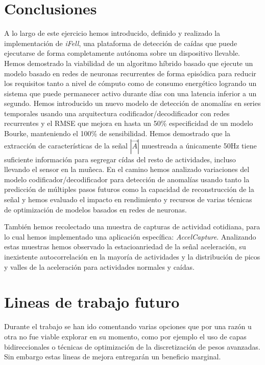 
\section{Conclusiones}

A lo largo de este ejercicio hemos introducido, definido y realizado la implementación de \textit{iFell}, una plataforma de detección de caídas que puede ejecutarse de forma completamente autónoma
sobre un dispositivo llevable. Hemos demostrado la viabilidad de un algoritmo híbrido basado que ejecute un modelo basado en redes de neuronas recurrentes de forma episódica para reducir los requisitos tanto a nivel de cómputo como de consumo energético logrando un sistema que puede permanecer activo durante días con una latencia inferior a un segundo. Hemos introducido un nuevo modelo de detección de anomalías en series temporales usando una arquitectura codificador/decodificador con redes recurrentes y el RMSE que mejora en hasta un 50\% especificidad de un modelo Bourke, manteniendo el 100\% de sensibilidad. Hemos demostrado que la extracción de características de la señal $|\vec{A}|$ muestreada a únicamente 50Hz tiene suficiente información para segregar cídas del resto de actividades, incluso llevando el sensor en la muñeca. En el camino hemos analizado variaciones del modelo codificador/decodificador para detección de anomalías usando tanto la predicción de múltiples pasos futuros como la capacidad de reconstrucción de la señal y hemos evaluado el impacto en rendimiento y recursos de varias técnicas de optimización de modelos basados en redes de neuronas.

También hemos recolectado una muestra de capturas de actividad cotidiana, para lo cual hemos implementado una aplicación específica: \textit{AccelCapture}. Analizando estas muestras hemos observado la estacioanriedad de la señal aceleración, su inexistente autocorrelación en la mayoría de actividades y la distribución de picos y valles de la aceleración para actividades normales y caídas.




\section{Lineas de trabajo futuro}

Durante el trabajo se han ido comentando varias opciones que por una razón u otra no fue viable explorar en su momento, como por ejemplo el uso de capas bidireccionales o técnicas de optimización de la discretización de pesos avanzadas. Sin embargo estas lineas de mejora entregarán un beneficio marginal.

